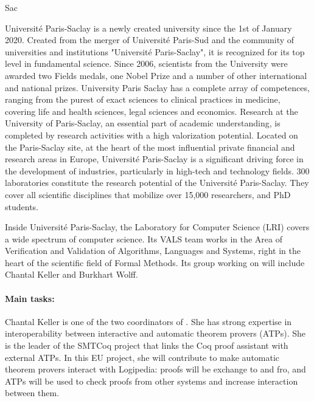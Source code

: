 \begin{sitedescription}{Sac}


Université Paris-Saclay is a newly created university since the 1st of
January 2020. Created from the merger of Université Paris-Sud and the
community of universities and institutions "Université Paris-Saclay", it
is recognized for its top level in fundamental science.  Since 2006,
scientists from the University were awarded two Fields medals, one Nobel
Prize and a number of other international and national prizes.
University Paris Saclay has a complete array of competences, ranging
from the purest of exact sciences to clinical practices in medicine,
covering life and health sciences, legal sciences and economics.
Research at the University of Paris-Saclay, an essential part of
academic understanding, is completed by research activities with a high
valorization potential. Located on the Paris-Saclay site, at the heart
of the most influential private financial and research areas in Europe,
Université Paris-Saclay is a significant driving force in the
development of industries, particularly in high-tech and technology
fields. 300 laboratories constitute the research potential of the
Université Paris-Saclay. They cover all scientific disciplines that
mobilize over 15,000 researchers, and PhD students.

Inside Université Paris-Saclay, the Laboratory for Computer Science
(LRI) covers a wide spectrum of computer science. Its VALS team works in
the Area of Verification and Validation of Algorithms, Languages and
Systems, right in the heart of the scientific field of Formal Methods.
Its group working on \pn will include Chantal Keller and Burkhart Wolff.

\paragraph*{Main tasks:}

Chantal Keller is one of the two coordinators of . She has
strong expertise in interoperability between interactive and automatic
theorem provers (ATPs). She is the leader of the SMTCoq project that
links the Coq proof assistant with external ATPs. In this EU project,
she will contribute to make automatic theorem provers interact with
Logipedia: proofs will be exchange to and fro, and ATPs will be used to
check proofs from other systems and increase interaction between them.


\end{sitedescription}
